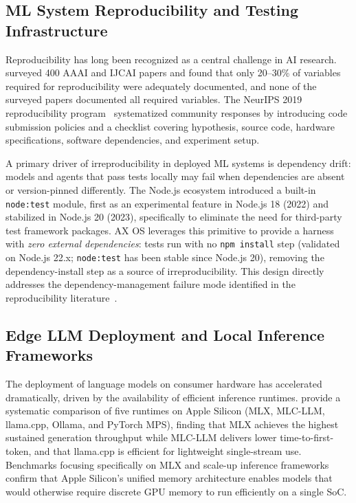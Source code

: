 \documentclass[10pt,twocolumn]{article}
\begin{document}
\subsection{ML System Reproducibility and Testing Infrastructure}
\label{sec:related:repro}

Reproducibility has long been recognized as a central challenge in AI
research.  \citet{gundersen2018state} surveyed 400 AAAI and IJCAI papers and
found that only 20--30\% of variables required for reproducibility were
adequately documented, and none of the surveyed papers documented all required
variables.  The NeurIPS 2019 reproducibility program~\citep{pineau2021improving}
systematized community responses by introducing code submission policies and a
checklist covering hypothesis, source code, hardware specifications, software
dependencies, and experiment setup.

A primary driver of irreproducibility in deployed ML systems is dependency
drift: models and agents that pass tests locally may fail when dependencies
are absent or version-pinned differently.  The Node.js ecosystem introduced a
built-in \texttt{node:test} module, first as an experimental feature in
Node.js 18 (2022) and stabilized in Node.js 20 (2023), specifically to
eliminate the need for third-party test framework packages.  AX OS leverages
this primitive to provide a harness with \emph{zero external dependencies}:
tests run with no \texttt{npm install} step (validated on Node.js 22.x;
\texttt{node:test} has been stable since Node.js 20), removing the
dependency-install step as a source of irreproducibility.  This design
directly addresses the dependency-management
failure mode identified in the reproducibility
literature~\citep{gundersen2018state,pineau2021improving}.

\subsection{Edge LLM Deployment and Local Inference Frameworks}
\label{sec:related:edge}

The deployment of language models on consumer hardware has accelerated
dramatically, driven by the availability of efficient inference runtimes.
\citet{rajesh2025productiongrade} provide a systematic comparison of five
runtimes on Apple Silicon (MLX, MLC-LLM, llama.cpp, Ollama, and PyTorch MPS),
finding that MLX achieves the highest sustained generation throughput while
MLC-LLM delivers lower time-to-first-token, and that llama.cpp is efficient
for lightweight single-stream use.  Benchmarks focusing specifically on MLX
\citep{ajayi2025benchmarking} and scale-up inference frameworks
\citep{barrios2026native} confirm that Apple Silicon's unified memory
architecture enables models that would otherwise require discrete GPU memory
to run efficiently on a single SoC.
\end{document}
